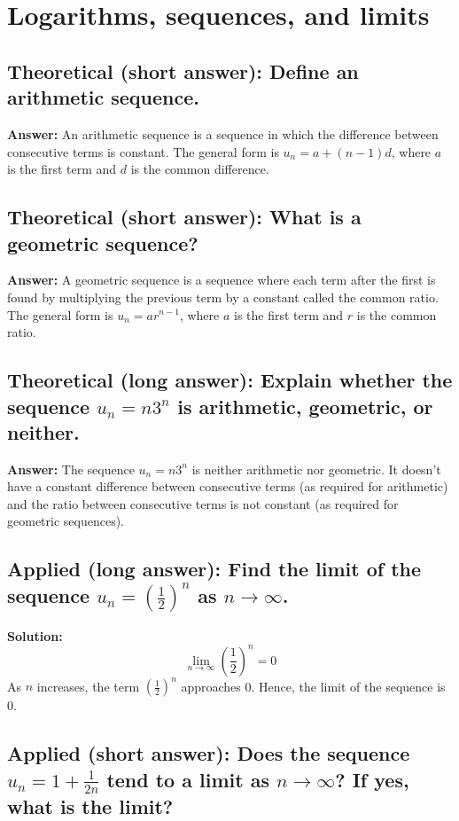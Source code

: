 \documentclass[12pt]{article}
\begin{document}
\section{Logarithms, sequences, and limits }
\subsection{Theoretical (short answer): Define an arithmetic sequence.}

\textbf{Answer:} An arithmetic sequence is a sequence in which the difference between consecutive terms is constant. The general form is \( u_n = a + (n-1)d \), where \( a \) is the first term and \( d \) is the common difference.

\subsection{Theoretical (short answer): What is a geometric sequence?}

\textbf{Answer:} A geometric sequence is a sequence where each term after the first is found by multiplying the previous term by a constant called the common ratio. The general form is \( u_n = ar^{n-1} \), where \( a \) is the first term and \( r \) is the common ratio.

\subsection{Theoretical (long answer): Explain whether the sequence \( u_n = n3^n \) is arithmetic, geometric, or neither.}

\textbf{Answer:} The sequence \( u_n = n3^n \) is neither arithmetic nor geometric. It doesn't have a constant difference between consecutive terms (as required for arithmetic) and the ratio between consecutive terms is not constant (as required for geometric sequences).

\subsection{Applied (long answer): Find the limit of the sequence \( u_n = \left( \frac{1}{2} \right)^n \) as \( n \to \infty \).}

\textbf{Solution:}
\[
\lim_{n \to \infty} \left( \frac{1}{2} \right)^n = 0
\]
As \( n \) increases, the term \( \left( \frac{1}{2} \right)^n \) approaches 0. Hence, the limit of the sequence is 0.

\subsection{Applied (short answer): Does the sequence \( u_n = 1 + \frac{1}{2n} \) tend to a limit as \( n \to \infty \)? If yes, what is the limit?}
\end{document}
